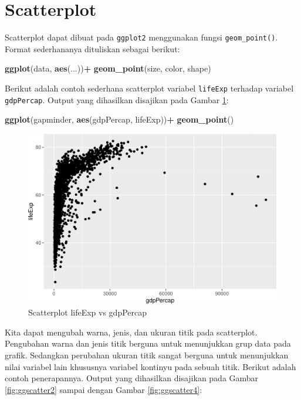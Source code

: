 \documentclass[]{book}
\newenvironment{Shaded}{\begin{snugshade}}{\end{snugshade}}
\newcommand{\KeywordTok}[1]{\textcolor[rgb]{0.13,0.29,0.53}{\textbf{#1}}}
\newcommand{\StringTok}[1]{\textcolor[rgb]{0.31,0.60,0.02}{#1}}
\newcommand{\OperatorTok}[1]{\textcolor[rgb]{0.81,0.36,0.00}{\textbf{#1}}}
\newcommand{\NormalTok}[1]{#1}
\begin{document}
\section{Scatterplot}\label{scatterplot}

Scatterplot dapat dibuat pada \texttt{ggplot2} menggunakan fungsi
\texttt{geom\_point()}. Format sederhananya dituliskan sebagai berikut:

\begin{Shaded}
\begin{Highlighting}[]
\KeywordTok{ggplot}\NormalTok{(data, }\KeywordTok{aes}\NormalTok{(...))}\OperatorTok{+}
\StringTok{  }\KeywordTok{geom_point}\NormalTok{(size, color, shape)}
\end{Highlighting}
\end{Shaded}

Berikut adalah contoh sederhana scatterplot variabel \texttt{lifeExp}
terhadap variabel \texttt{gdpPercap}. Output yang dihasilkan disajikan
pada Gambar \ref{fig:ggscatter}:

\begin{Shaded}
\begin{Highlighting}[]
\KeywordTok{ggplot}\NormalTok{(gapminder, }\KeywordTok{aes}\NormalTok{(gdpPercap, lifeExp))}\OperatorTok{+}
\StringTok{  }\KeywordTok{geom_point}\NormalTok{()}
\end{Highlighting}
\end{Shaded}

\begin{figure}

{\centering \includegraphics[width=0.7\linewidth]{EnvStat_files/figure-latex/ggscatter-1} 

}

\caption{Scatterplot lifeExp vs gdpPercap}\label{fig:ggscatter}
\end{figure}

Kita dapat mengubah warna, jenis, dan ukuran titik pada scatterplot.
Pengubahan warna dan jenis titik berguna untuk menunjukkan grup data
pada grafik. Sedangkan perubahan ukuran titik sangat berguna untuk
menunjukkan nilai variabel lain khususnya variabel kontinyu pada sebuah
titik. Berikut adalah contoh penerapannya. Output yang dihasilkan
disajikan pada Gambar \ref{fig:ggscatter2} sampai dengan Gambar
\ref{fig:ggscatter4}:
\end{document}
